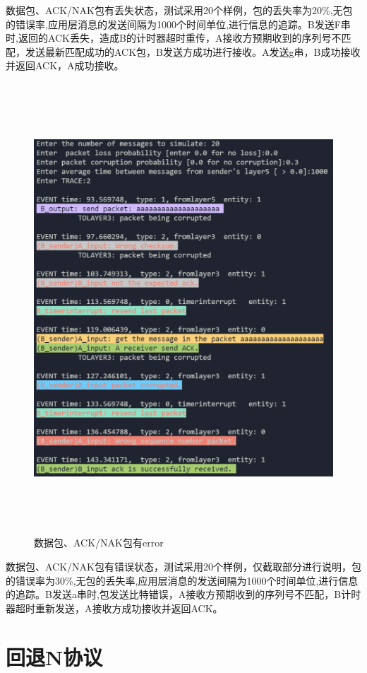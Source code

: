 \documentclass[UTF8,14pt]{article}
\numberwithin{figure}{section}
\begin{document}
数据包、ACK/NAK包有丢失状态，测试采用20个样例，包的丢失率为20\%,无包的错误率,应用层消息的发送间隔为1000个时间单位,进行信息的追踪。B发送F串时,返回的ACK丢失，造成B的计时器超时重传，A接收方预期收到的序列号不匹配，发送最新匹配成功的ACK包，B发送方成功进行接收。A发送g串，B成功接收并返回ACK，A成功接收。
\newpage
\begin{figure}[!htbp]
      \centering
      \includegraphics[width=15cm,height=16.85cm]{figures/result4_1.png}
      \caption{数据包、ACK/NAK包有error}
\end{figure}

数据包、ACK/NAK包有错误状态，测试采用20个样例，仅截取部分进行说明，包的错误率为30\%,无包的丢失率,应用层消息的发送间隔为1000个时间单位,进行信息的追踪。B发送a串时,包发送比特错误，A接收方预期收到的序列号不匹配，B计时器超时重新发送，A接收方成功接收并返回ACK。
\clearpage
\section{回退N协议}
\end{document}
